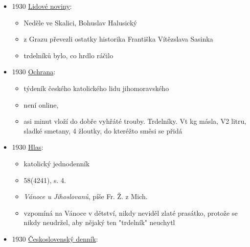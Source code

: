 \begin{itemize}
  \begin{itemize}
  \tightlist
  \item
    článek Der Prügelkrapfen, č. 5, s. 221
  \item
    Ignaz Göth
  \item
    Překlad: Trdelník (nebo doslova „Hůlkový koblih``) To je zvláštní
    jihomoravské pečivo, které se peče na otevřeném ohništi. Přes
    konstrukci podobnou studni leží dřevěná hřídel, do které jsou
    zasazeny boční tyče. Zasazená hřídel se otáčí a těsto se pomalu
    podél hřídele se na ni nalévá (těsto), takže trdelník (koblih) je
    stále tlustší. Po upečení se tyčky vytáhnou, hřídel se také
    odstraní. Když je trdelník vychladlý, pocukruje se a ozdobí. Jihlava
    - Znojmo.
  \item
    obrázek zdobenýho trdelníku
  \end{itemize}
\item
  1930
  \href{https://ceskadigitalniknihovna.cz/uuid/uuid:af245650-9670-11dc-8c7e-000d606f5dc6}{Lidové
  noviny}:

  \begin{itemize}
  \tightlist
  \item
    Neděle ve Skalici, Bohuslav Halusický
  \item
    z Grazu převezli ostatky historika Františka Vítězslava Sasinka
  \item
    trdelníků bylo, co hrdlo ráčilo
  \end{itemize}
\item
  1930
  \href{https://www.digitalniknihovna.cz/kkvhb/uuid/uuid:18d7dc73-2477-4958-bf8d-e68b3121f660}{Ochrana}:

  \begin{itemize}
  \tightlist
  \item
    týdeník českého katolického lidu jihomoravského
  \item
    není online, 
  \item
    asi  minut vloží do dobře vyhřáté trouby.
    Trdelníky. Vt kg másla, V2 litru, sladké smetany, 4 žloutky, do
    kteréžto směsi se přidá
  \end{itemize}
\item
  1930
  \href{https://www.digitalniknihovna.cz/nm/uuid/uuid:d6e786d9-6b06-4c65-a82b-6fa9dd049831}{Hlas}:

  \begin{itemize}
  \tightlist
  \item
    katolický jednodenník
  \item
    58(4241), s. 4.
  \item
    \emph{Vánoce u Jihoslovanů}, píše Fr. Ž. z Mich.
  \item
    vzpomíná na Vánoce v dětství, nikdy neviděl zlaté prasátko, protože
    se nikdy neudržel, aby nějaký ten "trdelník" neuchytl
  \end{itemize}
\item
  1930
  \href{https://www.digitalniknihovna.cz/vkol/uuid/uuid:d9482bd6-9efc-4d35-bdd4-7f27aa09fc38}{Československý
  denník}:


\end{itemize}
